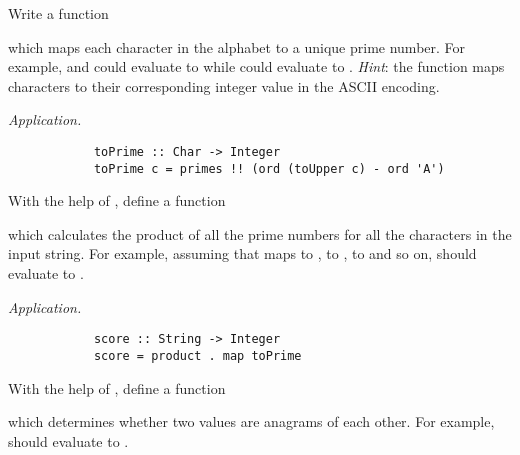 \begin{parts}
	\begin{subparts}
		\subpart[4] Write a function 
		
		\begin{center}
		\end{center}
	
		which maps each character in the alphabet to a unique prime number. For example,  and  could evaluate to  while  could evaluate to . \emph{Hint}: the  function maps characters to their corresponding integer value in the ASCII encoding.  \droppoints 
		
		\begin{solution}
			\emph{Application.} 
			\begin{verbatim}
			toPrime :: Char -> Integer
			toPrime c = primes !! (ord (toUpper c) - ord 'A')
			\end{verbatim}
		\end{solution}
		
		\subpart[3] With the help of , define a function
		
		\begin{center}
		\end{center}
	
		which calculates the product of all the prime numbers for all the characters in the input string. For example, assuming that  maps  to ,  to ,  to  and so on,  should evaluate to . \droppoints 
		
		\begin{solution}
			\emph{Application.} 
			\begin{verbatim}
			score :: String -> Integer
			score = product . map toPrime
			\end{verbatim}
		\end{solution}
	
		\subpart[2] With the help of , define a function 
		
		\begin{center}
		\end{center}
	
		which determines whether two  values are anagrams of each other. For example,  should evaluate to . \droppoints 
	

\end{subparts}
\end{parts}

